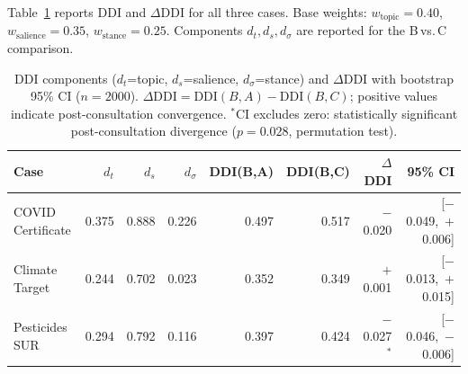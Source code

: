 \documentclass[sigconf,natbib]{acmart}
\begin{document}
Table~\ref{tab:ddi} reports DDI and $\Delta$DDI for all three cases.
Base weights: $w_{\text{topic}}=0.40$, $w_{\text{salience}}=0.35$, $w_{\text{stance}}=0.25$.
Components $d_t, d_s, d_\sigma$ are reported for the B\,vs.\,C comparison.

\begin{table}[t]
\centering
\small
\begin{tabular}{lrrrrrrr}
\toprule
\textbf{Case} & $d_t$ & $d_s$ & $d_\sigma$ & \textbf{DDI(B,A)} & \textbf{DDI(B,C)} & $\Delta$\textbf{DDI} & \textbf{95\% CI} \\
\midrule
COVID Certificate  & 0.375 & 0.888 & 0.226 & 0.497 & 0.517 & $-$0.020 & [$-$0.049,~$+$0.006] \\
Climate Target     & 0.244 & 0.702 & 0.023 & 0.352 & 0.349 & $+$0.001 & [$-$0.013,~$+$0.015] \\
Pesticides SUR     & 0.294 & 0.792 & 0.116 & 0.397 & 0.424 & $-$0.027$^*$ & [$-$0.046,~$-$0.006] \\
\bottomrule
\end{tabular}
\caption{DDI components ($d_t$=topic, $d_s$=salience, $d_\sigma$=stance) and $\Delta$DDI
with bootstrap 95\% CI ($n=2000$). $\Delta\text{DDI} = \text{DDI}(B,A) - \text{DDI}(B,C)$;
positive values indicate post-consultation convergence.
$^*$CI excludes zero: statistically significant post-consultation divergence ($p=0.028$, permutation test).}
\label{tab:ddi}
\end{table}
\end{document}
